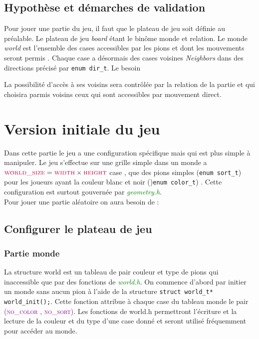 \documentclass[a4paper]{article}
\begin{document}
\subsection{Hypothèse et démarches de validation}

Pour jouer une partie du jeu, il faut que le plateau de jeu soit définie au préalable. Le plateau de jeu \textit{board}  étant le binôme monde et relation. 
Le monde \textit{world} est l’ensemble des cases accessibles par les pions et dont les mouvements seront permis . Chaque case a désormais des cases voisines \textit{Neighbors} dans des directions précisé par \lstinline|enum dir_t|.
Le besoin 

La possibilité d’accès à ses voisins sera contrôlée par la relation de la partie et qui choisira parmis voisins ceux qui sont accessibles par mouvement direct.  
\section{Version initiale du jeu}
Dans cette partie le jeu a une configuration spécifique mais qui est plus simple à manipuler. Le jeu s’effectue sur une grille simple dans un monde a $\textcolor{purple}{\textsc{world\_size}} = \textcolor{purple}{\textsc{width}} \times \textcolor{purple}{\textsc{height}}$  case , que des pions simples (\lstinline|enum sort_t|) pour les joueurs ayant la couleur blanc et noir ()\lstinline|enum color_t|) . Cette configuration est surtout gouvernée par \textcolor{green}{\textit{geometry.h}}. \\
Pour jouer une partie aléatoire on aura besoin de :
\subsection{Configurer le plateau de jeu}
\subsubsection{Partie monde}
La structure world est un tableau de pair couleur et type de pions qui inaccessible que par des fonctions de \textcolor{green}{\textit{world.h}}. On commence d’abord par initier un monde sans aucun pion à l’aide de la structure \lstinline|struct world_t* world_init();|. Cette fonction attribue à chaque case du tableau monde le pair \textcolor{purple}{\textsc{(no\_color , no\_sort)}}. Les fonctions de world.h permettront l’écriture et la lecture de la couleur et du type d’une case donné et seront utilisé fréquemment pour accéder au monde.  
\end{document}
